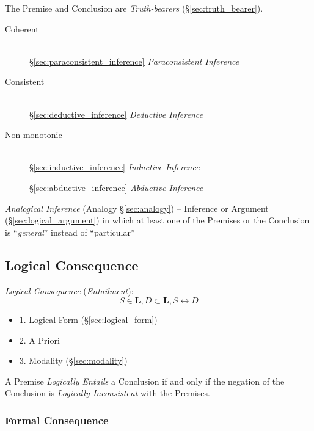 The Premise and Conclusion are \emph{Truth-bearers}
(\S\ref{sec:truth_bearer}).

\begin{description}
\item [Coherent] \hfill\\
  \S\ref{sec:paraconsistent_inference}
  \emph{Paraconsistent Inference}

\item [Consistent] \hfill\\
  \S\ref{sec:deductive_inference} \emph{Deductive Inference}

\item [Non-monotonic] \hfill\\
  \S\ref{sec:inductive_inference} \emph{Inductive Inference}

  \S\ref{sec:abductive_inference} \emph{Abductive Inference}

\end{description}

\fist \emph{Analogical Inference} (Analogy \S\ref{sec:analogy}) --
Inference or Argument (\S\ref{sec:logical_argument}) in which at least one of
the Premises or the Conclusion is ``\emph{general}'' instead of ``particular''



\subsection{Logical Consequence}\label{sec:logical_consequence}
\cite{beall-restall05}

\emph{Logical Consequence} (\emph{Entailment}):
\[
  S \in \mathbf{L}, D \subset \mathbf{L}, S \leftrightarrow D
\]
\begin{itemize}
  \item 1. Logical Form (\S\ref{sec:logical_form})
  \item 2. A Priori
  \item 3. Modality (\S\ref{sec:modality})
\end{itemize}

A Premise \emph{Logically Entails} a Conclusion if and only if the negation of
the Conclusion is \emph{Logically Inconsistent} with the Premises.



\subsubsection{Formal Consequence}\label{sec:formal_consequence}

